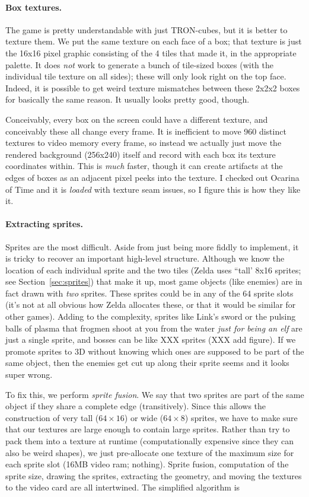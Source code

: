 \documentclass[twocolumn]{article}
\begin{document}
\paragraph{Box textures.}
The game is pretty understandable with just TRON-cubes, but it is
better to texture them. We put the same texture on each face of a box;
that texture is just the 16x16 pixel graphic consisting of the 4 tiles
that made it, in the appropriate palette. It does {\it not} work to
generate a bunch of tile-sized boxes (with the individual tile texture
on all sides); these will only look right on the top face. Indeed, it
is possible to get weird texture mismatches between these 2x2x2 boxes
for basically the same reason. It usually looks pretty good, though.

Conceivably, every box on the screen could have a different texture,
and conceivably these all change every frame. It is inefficient to
move 960 distinct textures to video memory every frame, so instead we
actually just move the rendered background (256x240) itself and record
with each box its texture coordinates within. This is {\it much}
faster, though it can create artifacts at the edges of boxes as an
adjacent pixel peeks into the texture. I checked out Ocarina of Time
and it is {\it loaded} with texture seam issues, so I figure this is
how they like it.

\paragraph{Extracting sprites.}
Sprites are the most difficult. Aside from just being more fiddly to
implement, it is tricky to recover an important high-level structure.
Although we know the location of each individual sprite and the two tiles
(Zelda uses ``tall' 8x16 sprites; see Section~\ref{sec:sprites}) that
make it up, most game objects (like enemies) are in fact drawn with
{\it two} sprites. These sprites could be in any of the 64 sprite
slots (it's not at all obvious how Zelda allocates these, or that it
would be similar for other games). Adding to the complexity, sprites
like Link's sword or the pulsing balls of plasma that frogmen shoot
at you from the water {\it just for being an elf} are just a single
sprite, and bosses can be like XXX sprites (XXX add figure). If we
promote sprites to 3D without knowing which ones are supposed to be
part of the same object, then the enemies get cut up along their
sprite seems and it looks super wrong.

To fix this, we perform {\it sprite fusion}. We say that two sprites
are part of the same object if they share a complete edge
(transitively). Since this allows the construction of very tall ($64
\times 16$) or wide ($64 \times 8$) sprites, we have to make sure that
our textures are large enough to contain large sprites. Rather than
try to pack them into a texture at runtime (computationally expensive
since they can also be weird shapes), we just pre-allocate one texture
of the maximum size for each sprite slot (16MB video ram; nothing).
Sprite fusion, computation of the sprite size, drawing the sprites,
extracting the geometry, and moving the textures to the video card are
all intertwined. The simplified algorithm is
\end{document}

